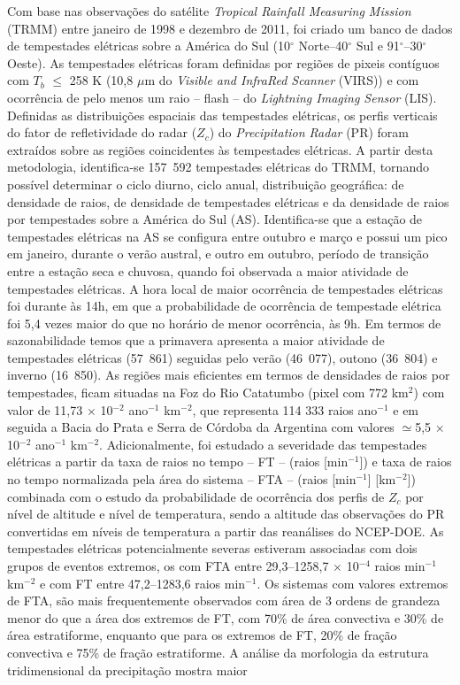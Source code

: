 \documentclass[12pt,a4paper,tocpage=plain,floatnumber=continuous,chapter=TITLE,appendix=nobox,font=plain, header=ruled,hyperindex=false]{abnt}
\begin{document}
\begin{resumo}

Com base nas observações do satélite \textit{Tropical Rainfall Measuring Mission} (TRMM) entre janeiro de  1998 e dezembro de 2011, foi criado um banco de dados de  tempestades elétricas sobre a América do Sul (10$^{\circ}$ Norte--40$^{\circ}$ Sul e 91$^{\circ}$--30$^{\circ}$ Oeste). As tempestades elétricas foram definidas por regiões de pixeis contíguos com $T_b$ $\leq$ 258 K  (10,8 $\mu$m do \textit{Visible and InfraRed Scanner} (VIRS)) e com ocorrência de pelo menos um raio -- flash --  do \textit{Lightning Imaging Sensor} (LIS). Definidas as distribuições espaciais das tempestades elétricas, os perfis verticais do fator de refletividade  do radar ($Z_c$) do \textit{Precipitation Radar} (PR) foram extraídos sobre as regiões coincidentes às tempestades elétricas. A partir desta metodologia, identifica-se 157~592 tempestades elétricas do TRMM, tornando possível determinar o ciclo diurno, ciclo anual, distribuição geográfica: de densidade de raios, de densidade de tempestades elétricas e da densidade de raios por tempestades sobre a América do Sul (AS). Identifica-se que a estação de tempestades elétricas na AS se configura entre outubro e março e  possui um pico em janeiro, durante o verão austral, e outro em outubro, período de transição entre a estação seca e chuvosa, quando foi observada a maior atividade de tempestades elétricas. A hora local de maior ocorrência de tempestades elétricas  foi durante às 14h, em que a probabilidade de ocorrência de tempestade elétrica foi 5,4 vezes maior do que no horário de menor ocorrência, às 9h. Em termos de sazonabilidade temos que a primavera apresenta a maior atividade de tempestades elétricas (57~861) seguidas pelo verão (46~077), outono (36~804) e inverno (16~850). As regiões mais eficientes em termos de densidades de raios por tempestades, ficam situadas na Foz do Rio Catatumbo (pixel com 772 km$^{2}$) com valor de 11,73 $\times$ 10$^{-2}$ ano$^{-1}$ km$^{-2}$, que representa {114 333} raios ano$^{-1}$ e em seguida a Bacia do Prata e Serra de Córdoba da Argentina com valores $\simeq$5,5 $\times$ 10$^{-2}$ ano$^{-1}$ km$^{-2}$. Adicionalmente, foi estudado a severidade das tempestades elétricas a partir da taxa de raios no tempo -- FT -- (raios [min$^{-1}$]) e taxa de raios no tempo normalizada pela área do sistema -- FTA -- (raios [min$^{-1}$] [km$^{-2}$]) combinada com o estudo da probabilidade de ocorrência dos perfis de $Z_c$ por nível de altitude e nível de temperatura, sendo a altitude das observações do PR convertidas em níveis de temperatura a partir das reanálises do NCEP-DOE.  As tempestades elétricas potencialmente severas estiveram associadas com dois grupos de eventos extremos, os com FTA entre 29,3--1258,7 $\times$ 10$^{-4}$ raios min$^{-1}$ km$^{-2}$ e com FT entre 47,2--1283,6 raios min$^{-1}$. Os sistemas com valores extremos de FTA, são mais frequentemente observados com área de 3 ordens de grandeza menor do que a área dos extremos de FT, com 70\% de área convectiva e 30\% de área estratiforme, enquanto que para os extremos de FT, 20\% de fração convectiva e 75\% de fração estratiforme. A análise da morfologia da estrutura tridimensional da precipitação mostra maior 
\end{resumo}
\end{document}
